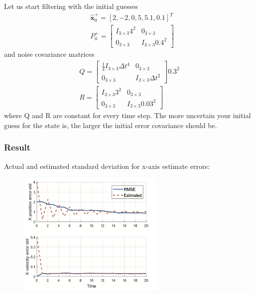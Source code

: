 \documentclass{beamer}
\begin{document}
\begin{frame}
Let us start filtering with the initial guesses
$$
\begin{aligned}
	& \hat{\boldsymbol{x}}_0^{+}=[2,-2,0,5,5.1,0.1]^T \\
	& P_0^{+}=\left[\begin{array}{cc}
		I_{3 \times 3} 4^2 & 0_{3 \times 3} \\
		0_{3 \times 3} & I_{3 \times 3} 0.4^2
	\end{array}\right]
\end{aligned}
$$
and noise covariance matrices
$$
\begin{gathered}
	Q=\left[\begin{array}{cc}
		\frac{1}{4} I_{3 \times 3} \Delta t^4 & 0_{3 \times 3} \\
		0_{3 \times 3} & I_{3 \times 3} \Delta t^2
	\end{array}\right] 0.3^2 \\
	R=\left[\begin{array}{cc}
		I_{3 \times 3} 3^2 & 0_{3 \times 3} \\
		0_{3 \times 3} & I_{3 \times 3} 0.03^2
	\end{array}\right]
\end{gathered}
$$
where Q and R are constant for every time step. The more uncertain your initial guess for the state is, the larger the initial error covariance should be.
\end{frame}


\begin{frame}
	\frametitle{Result}
	Actual and estimated standard deviation for x-axis estimate errors: 
	\begin{figure}
		\centering
		\includegraphics[width=7cm]{standard_deviation.png}
	\end{figure}
\end{frame}
\end{document}
